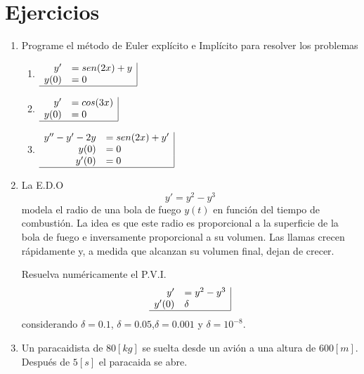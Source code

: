 \documentclass[11pt]{article}
\begin{document}
\section{Ejercicios}
\begin{enumerate}
\item Programe el m\'etodo de Euler expl\'icito e Impl\'icito para resolver los problemas
\begin{multicols}{2}
\begin{enumerate}
\item
$\begin{array}{rl|}
y'	&=sen(2x)+y\\
y(0) &=0\\ \hline
\end{array}$
\item
$\begin{array}{rl|}
y'	&=cos(3x)\\
y(0)&=0\\ \hline
\end{array}$
\item
$\begin{array}{rl|}
y''-y'-2y	&=sen(2x)+y'\\
y(0)&=0\\
y'(0)&=0\\ \hline
\end{array}$
\end{enumerate}
\end{multicols}

\item La E.D.O
$$
y'=y^2-y^3
$$
modela el radio de una bola de fuego $y(t)$ en funci\'on del tiempo de combusti\'on. La idea es que este radio es proporcional a la superficie de la bola de fuego e inversamente proporcional a su volumen. Las llamas crecen r\'apidamente y, a medida que alcanzan su volumen final, dejan de crecer. 

Resuelva num\'ericamente el P.V.I.
$$
\begin{array}{rl|}
y' 		&=y^2-y^3 \\
y'(0) 	& \delta \\ \hline
\end{array}
$$
considerando $\delta=0.1$, $\delta=0.05$,$\delta=0.001$ y $\delta=10 ^{-8}$.

\item Un paracaidista de $80[kg]$ se suelta desde un avi\'on a una altura de $600[m]$. Despu\'es de $5[s]$ el paracaida se abre.


\end{enumerate}
\end{document}
